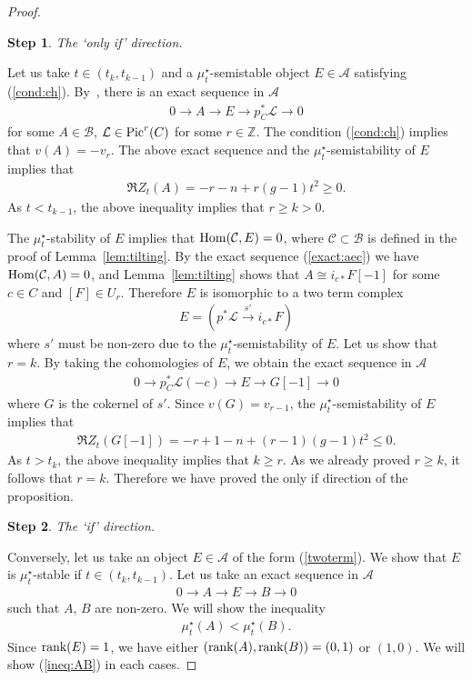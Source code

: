 \documentclass[11pt]{amsart}
\theoremstyle{plain}
\newtheorem{sstep}{Step}
\newcommand{\aA}{\mathcal{A}}
\newcommand{\bB}{\mathcal{B}}
\newcommand{\cC}{\mathcal{C}}
\newcommand{\lL}{\mathcal{L}}
\newcommand{\Hom}{\mathop{\rm Hom}\nolimits}
\newcommand{\Pic}{\mathop{\rm Pic}\nolimits}
\newcommand{\rank}{\mathop{\rm rank}\nolimits}
\begin{document}
\begin{proof}
\begin{sstep}
The `only if' direction. 
\end{sstep}
Let us take 
$t \in (t_{k}, t_{k-1})$ and 
a $\mu_t^{\star}$-semistable
object $E \in \aA$ satisfying (\ref{cond:ch}). 
By~\cite[Lemma~7.5]{TodK3}, 
there is an exact sequence in $\aA$
\begin{align}\label{exact:aec}
0 \to A \to E \to p_C^{\ast}\lL \to 0
\end{align}
for some $A \in \bB$, 
$\lL \in \Pic^r(C)$
for some $r \in \mathbb{Z}$.  
The condition (\ref{cond:ch}) 
implies that 
$v(A)=-v_r$. 
The above exact sequence and the 
$\mu_t^{\star}$-semistability of 
$E$ implies that
\begin{align*}
\Re Z_t(A)=-r-n+r(g-1)t^2 \ge 0.
\end{align*}
As $t<t_{k-1}$, 
the above inequality implies that $r\ge k>0$. 

The $\mu_t^{\star}$-stability of 
$E$ 
implies that $\Hom(\cC, E)=0$, 
where $\cC \subset \bB$ is defined in the proof of Lemma~\ref{lem:tilting}. 
By the exact sequence (\ref{exact:aec}) we have $\Hom(\cC, A)=0$, and 
Lemma~\ref{lem:tilting} shows that 
$A \cong i_{c\ast}F[-1]$
for some $c \in C$ and $[F] \in U_r$.
Therefore $E$ is isomorphic to 
a two term complex 
\begin{align*}
E=(p^{\ast}\lL \stackrel{s'}{\to} 
i_{c\ast}F)
\end{align*}
where $s'$ must be non-zero due to the 
$\mu_t^{\star}$-semistability of $E$. 
Let us show that 
$r=k$. 
By taking the cohomologies of $E$, 
we obtain the exact sequence in $\aA$
\begin{align}\label{exact:rEG}
0 \to p_C^{\ast}\lL(-c) \to E \to G[-1] \to 0
\end{align}
where $G$ is the cokernel of $s'$. 
Since $v(G)=v_{r-1}$, the $\mu_t^{\star}$-semistability 
of $E$
implies that
\begin{align}\label{eqn:ZG}
\Re Z_t(G[-1])=-r+1-n+(r-1)(g-1)t^2 \le 0.
\end{align}
As $t>t_k$, 
the above inequality implies that  
$k\ge r$. As we already proved $r\ge k$, 
it follows that $r=k$. 
Therefore we have proved the only if direction of the proposition. 

\begin{sstep}
The `if' direction.
\end{sstep}
Conversely, let us take an object $E \in \aA$
of the form (\ref{twoterm}). 
We show that $E$ is $\mu_t^{\star}$-stable
if $t \in (t_k, t_{k-1})$. 
Let us take an exact sequence in $\aA$
\begin{align}\label{exact:AEB}
0 \to A \to E \to B \to 0
\end{align}
such that $A$, $B$ are non-zero. 
We will show the inequality
\begin{align}\label{ineq:AB}
\mu_t^{\star}(A)<\mu_t^{\star}(B).
\end{align}
Since $\rank(E)=1$, we have either 
$(\rank(A), \rank(B))=(0, 1)$ or $(1, 0)$. 
We will show (\ref{ineq:AB})
in each cases. 


\end{proof}
\end{document}
